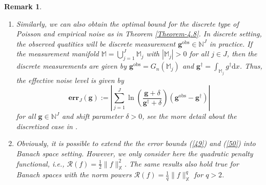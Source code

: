 \documentclass[10pt]{iopart}
\newtheorem{remark}[theorem]{Remark}
\begin{document}
\begin{remark}\label{Remark-4.9}
\begin{enumerate}
\item Similarly, we can also obtain the optimal bound for the discrete type of Poisson and empirical noise as in Theorem \ref{Theorem-4.8}. 
In discrete setting, the observed quatities will be discrete measurement $\mathbf{g}^{\text{obs}}\in\mathbb{N}^{J}$ in practice.
If the measurement manifold $\mathbb{M}=\bigcup_{j=1}^{J}\mathbb{M}_{j}$ with $|\mathbb{M}_{j}|>0$ for all $j\in J$, 
then the discrete measurements are given by $\mathbf{g}^{\text{obs}}=G_{n}(\mathbb{M}_{j})$ and $\mathbf{g}^{\dagger}
=\int_{\mathbb{M}_{j}}g^{\dagger}\mathrm{d}x$. Thus, the effective noise level is given by
\begin{equation*}
\mathbf{err}_{J}(\mathbf{g}):=\left|\sum_{j=1}^{J}\ln \left(\frac{\mathbf{g}+\delta}{\mathbf{g}^{\dagger}+\delta}\right)
(\mathbf{g}^{\text{obs}}-\mathbf{g}^{\dagger})\right|
\end{equation*}
for all $\mathbf{g}\in\mathbb{N}^{J}$ and shift parameter $\delta>0$, see the more detail about the discretized case in \cite{Hohage2013}. 

\item Obviously, it is possible to extend the the error bounds (\ref{49}) and (\ref{50}) into Banach space setting. However, we only
consider here the quadratic penalty functional, i.e., $\mathcal{R}(f)=\frac{1}{2}\|f\|_{\mathbb{X}}^{2}$. The same results also hold
true for Banach spaces with the norm powers $\mathcal{R}(f)=\frac{1}{q}\|f\|_{\mathbb{X}}^{q}$ for $q>2$.
\end{enumerate}
\end{remark}
\end{document}
